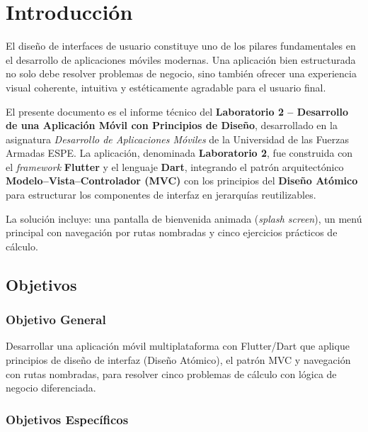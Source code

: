 \documentclass[12pt,a4paper]{article}
\begin{document}
\newpage
{}
\setcounter{page}{1}

\section{Introducción}

El diseño de interfaces de usuario constituye uno de los pilares fundamentales en el desarrollo de aplicaciones móviles modernas. Una aplicación bien estructurada no solo debe resolver problemas de negocio, sino también ofrecer una experiencia visual coherente, intuitiva y estéticamente agradable para el usuario final.

El presente documento es el informe técnico del \textbf{Laboratorio 2 -- Desarrollo de una Aplicación Móvil con Principios de Diseño}, desarrollado en la asignatura \textit{Desarrollo de Aplicaciones Móviles} de la Universidad de las Fuerzas Armadas ESPE. La aplicación, denominada \textbf{Laboratorio 2}, fue construida con el \textit{framework} \textbf{Flutter} y el lenguaje \textbf{Dart}, integrando el patrón arquitectónico \textbf{Modelo--Vista--Controlador (MVC)} con los principios del \textbf{Diseño Atómico} para estructurar los componentes de interfaz en jerarquías reutilizables.

La solución incluye: una pantalla de bienvenida animada (\textit{splash screen}), un menú principal con navegación por rutas nombradas y cinco ejercicios prácticos de cálculo.

\subsection{Objetivos}

\subsubsection{Objetivo General}

Desarrollar una aplicación móvil multiplataforma con Flutter/Dart que aplique principios de diseño de interfaz (Diseño Atómico), el patrón MVC y navegación con rutas nombradas, para resolver cinco problemas de cálculo con lógica de negocio diferenciada.

\subsubsection{Objetivos Específicos}
\end{document}
